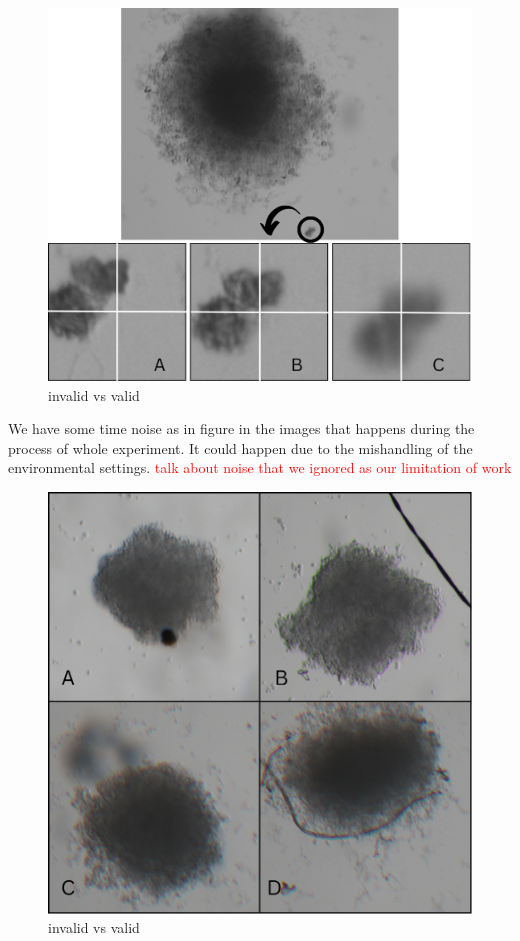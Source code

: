  \begin{figure}[H]
  \centering
  \includegraphics[scale=0.4]{figures/posi.png} 
  \caption{invalid vs valid}
  \label{fig:posi}
\end{figure}

We have some time noise as in figure in the images that happens during the process of whole experiment. It could happen due to the mishandling of the
 environmental settings.
 \textcolor{red}{talk about noise that we ignored as our limitation of work}
  
 \begin{figure}[H]
  \centering
  \includegraphics[scale=0.4]{figures/noise.png} 
  \caption{invalid vs valid}
  \label{fig:noise}
\end{figure}
 

